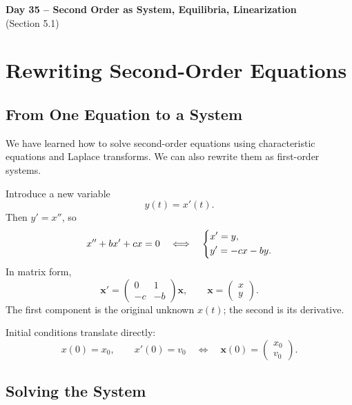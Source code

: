 \documentclass[10pt,letterpaper]{article}
\begin{document}
\begin{center}
\Large\textbf{Day 35 –  Second Order as System, Equilibria, Linearization}\\
\normalsize (Section 5.1)
\end{center}

\section{Rewriting Second-Order Equations}

\subsection{From One Equation to a System}

We have learned how to solve second-order equations
using characteristic equations and Laplace transforms.
We can also rewrite them as first-order systems.

Introduce a new variable
\[
y(t)=x'(t).
\]
Then $y'=x''$, so
\[
x''+bx'+cx=0
\quad\Longleftrightarrow\quad
\begin{dcases}
x'=y,\\
y'=-cx-by.
\end{dcases}
\]
In matrix form,
\[
\boxed{
\mathbf{x}'=
\begin{pmatrix}
0&1\\
-c&-b
\end{pmatrix}\mathbf{x},
\qquad
\mathbf{x}=
\begin{pmatrix}x\\y\end{pmatrix}.
}
\]
The first component is the original unknown $x(t)$;
the second is its derivative.

Initial conditions translate directly:
\[
x(0)=x_0,\qquad x'(0)=v_0
\quad\Longleftrightarrow\quad
\mathbf{x}(0)=
\begin{pmatrix}x_0\\v_0\end{pmatrix}.
\]

\subsection{Solving the System}
\end{document}
